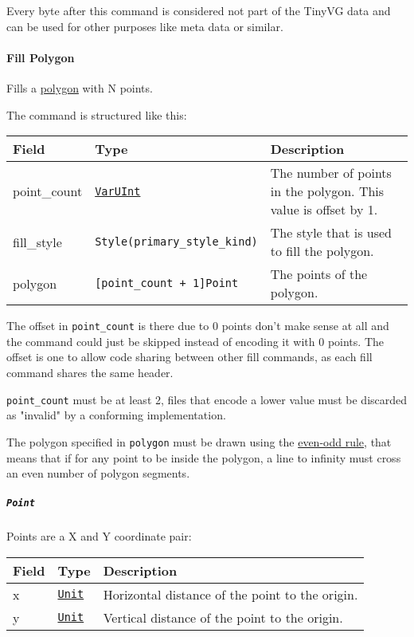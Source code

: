 \documentclass[
]{article}
\begin{document}
Every byte after this command is considered not part of the TinyVG data
and can be used for other purposes like meta data or similar.

\hypertarget{fill-polygon}{%
\paragraph{Fill Polygon}\label{fill-polygon}}

Fills a \href{https://en.wikipedia.org/wiki/Polygon}{polygon} with N
points.

The command is structured like this:

\begin{longtable}[]{@{}lll@{}}
\toprule
Field & Type & Description \\
\midrule
\endhead
point\_count & \protect\hyperlink{varuint}{\texttt{VarUInt}} & The
number of points in the polygon. This value is offset by 1. \\
fill\_style & \texttt{Style(primary\_style\_kind)} & The style that is
used to fill the polygon. \\
polygon & \texttt{{[}point\_count\ +\ 1{]}Point} & The points of the
polygon. \\
\bottomrule
\end{longtable}

The offset in \texttt{point\_count} is there due to 0 points don't make
sense at all and the command could just be skipped instead of encoding
it with 0 points. The offset is one to allow code sharing between other
fill commands, as each fill command shares the same header.

\texttt{point\_count} must be at least 2, files that encode a lower
value must be discarded as "invalid" by a conforming implementation.

The polygon specified in \texttt{polygon} must be drawn using the
\href{https://en.wikipedia.org/wiki/Even\%E2\%80\%93odd_rule}{even-odd
rule}, that means that if for any point to be inside the polygon, a line
to infinity must cross an even number of polygon segments.

\hypertarget{point}{%
\subparagraph{\texorpdfstring{\texttt{Point}}{Point}}\label{point}}

Points are a X and Y coordinate pair:

\begin{longtable}[]{@{}lll@{}}
\toprule
Field & Type & Description \\
\midrule
\endhead
x & \protect\hyperlink{units}{\texttt{Unit}} & Horizontal distance of
the point to the origin. \\
y & \protect\hyperlink{units}{\texttt{Unit}} & Vertical distance of the
point to the origin. \\
\bottomrule
\end{longtable}
\end{document}
